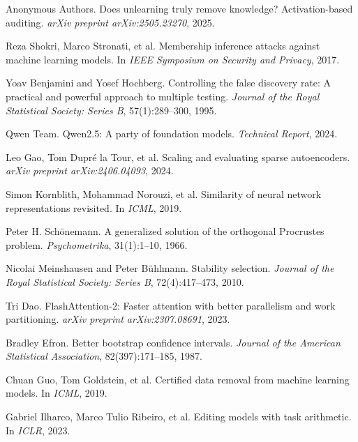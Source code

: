 \documentclass[11pt]{article}
\begin{document}
\begin{thebibliography}{99}
Anonymous Authors.
\newblock Does unlearning truly remove knowledge? Activation-based auditing.
\newblock \textit{arXiv preprint arXiv:2505.23270}, 2025.

Reza Shokri, Marco Stronati, et al.
\newblock Membership inference attacks against machine learning models.
\newblock In \textit{IEEE Symposium on Security and Privacy}, 2017.

Yoav Benjamini and Yosef Hochberg.
\newblock Controlling the false discovery rate: A practical and powerful approach to multiple testing.
\newblock \textit{Journal of the Royal Statistical Society: Series B}, 57(1):289--300, 1995.

Qwen Team.
\newblock Qwen2.5: A party of foundation models.
\newblock \textit{Technical Report}, 2024.

Leo Gao, Tom Dupré la Tour, et al.
\newblock Scaling and evaluating sparse autoencoders.
\newblock \textit{arXiv preprint arXiv:2406.04093}, 2024.

Simon Kornblith, Mohammad Norouzi, et al.
\newblock Similarity of neural network representations revisited.
\newblock In \textit{ICML}, 2019.

Peter H. Schönemann.
\newblock A generalized solution of the orthogonal Procrustes problem.
\newblock \textit{Psychometrika}, 31(1):1--10, 1966.

Nicolai Meinshausen and Peter Bühlmann.
\newblock Stability selection.
\newblock \textit{Journal of the Royal Statistical Society: Series B}, 72(4):417--473, 2010.

Tri Dao.
\newblock FlashAttention-2: Faster attention with better parallelism and work partitioning.
\newblock \textit{arXiv preprint arXiv:2307.08691}, 2023.

Bradley Efron.
\newblock Better bootstrap confidence intervals.
\newblock \textit{Journal of the American Statistical Association}, 82(397):171--185, 1987.

Chuan Guo, Tom Goldstein, et al.
\newblock Certified data removal from machine learning models.
\newblock In \textit{ICML}, 2019.

Gabriel Ilharco, Marco Tulio Ribeiro, et al.
\newblock Editing models with task arithmetic.
\newblock In \textit{ICLR}, 2023.


\end{thebibliography}
\end{document}
